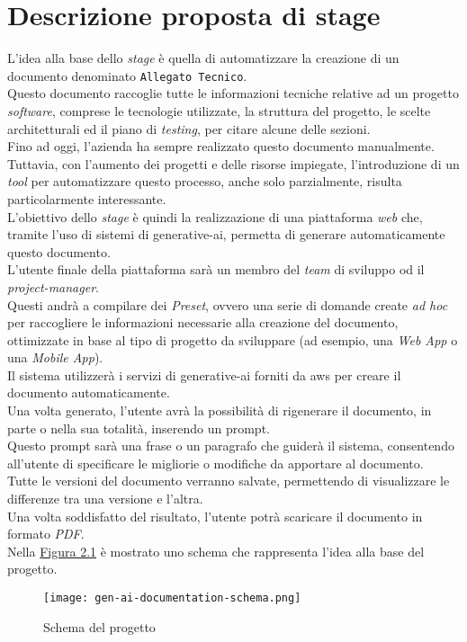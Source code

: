 \section{Descrizione proposta di stage}
\label{sez:descrizione-stage}

L'idea alla base dello \textit{stage} è quella di automatizzare la creazione di un documento denominato \texttt{Allegato Tecnico}.\\  
Questo documento raccoglie tutte le informazioni tecniche relative ad un progetto \textit{software}, comprese le tecnologie utilizzate,
la struttura del progetto, le scelte architetturali ed il piano di \textit{testing}, per citare alcune delle sezioni.\\  
Fino ad oggi, l'azienda ha sempre realizzato questo documento manualmente.\\
Tuttavia, con l'aumento dei progetti e delle risorse impiegate,
l'introduzione di un \textit{tool} per automatizzare questo processo, anche solo parzialmente, risulta particolarmente interessante.\\  

\pagebreak
\noindent L'obiettivo dello \textit{stage} è quindi la realizzazione di una piattaforma \textit{web} che, tramite l'uso di sistemi di \gls{generative-ai},  
permetta di generare automaticamente questo documento.\\  
L'utente finale della piattaforma sarà un membro del \textit{team} di sviluppo od il \textit{project-manager}.\\  
Questi andrà a compilare dei \textit{Preset}, ovvero una serie di domande create \textit{ad hoc}
per raccogliere le informazioni necessarie alla creazione del documento, ottimizzate in base al tipo di progetto da sviluppare (ad esempio, una \textit{Web App} o una \textit{Mobile App}).\\  
Il sistema utilizzerà i servizi di \gls{generative-ai} forniti da \gls{aws} per creare il documento automaticamente.\\  

\noindent Una volta generato, l'utente avrà la possibilità di rigenerare il documento, in parte o nella sua totalità, inserendo un \gls{prompt}.\\  
Questo \gls{prompt} sarà una frase o un paragrafo che guiderà il sistema, consentendo all'utente di specificare le migliorie o modifiche da apportare al documento.\\  
Tutte le versioni del documento verranno salvate, permettendo di visualizzare le differenze tra una versione e l'altra.\\  
Una volta soddisfatto del risultato, l'utente potrà scaricare il documento in formato \textit{PDF}.\\  
Nella {\hyperref[fig:project-schema]{Figura 2.1}} è mostrato uno schema che rappresenta l'idea alla base del progetto.\\  


\begin{figure}[H]
    \label{fig:project-schema}
    \centering
    \texttt{[image: gen-ai-documentation-schema.png]}
    \caption{Schema del progetto}
\end{figure}